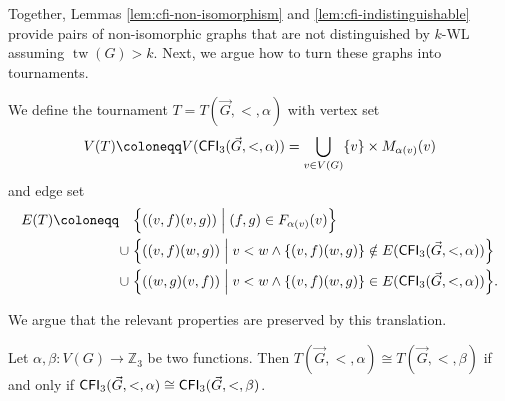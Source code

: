 \documentclass{theoretics}
\newcommand{\ZZ}{{\mathbb Z}}
\newcommand{\Bigmid}{\;\Big|\;}
\DeclareMathOperator{\tw}{tw}
\newcommand{\CFI}{{\sf CFI}}
\begin{document}
Together, Lemmas \ref{lem:cfi-non-isomorphism} and \ref{lem:cfi-indistinguishable} provide pairs of non-isomorphic graphs that are not distinguished by $k$-WL assuming $\tw(G) > k$.
Next, we argue how to turn these graphs into tournaments.

We define the tournament $T = T(\vec{G},<,\alpha)$ with vertex set
\[V(T) \coloneqq V(\CFI_3(\vec{G},<,\alpha)) = \bigcup_{v \in V(G)} \{v\} \times M_{\alpha(v)}(v)\]
and edge set
\begin{align*}
 E(T) \coloneqq \quad  &\Big\{((v,f)(v,g)) \Bigmid (f,g) \in F_{\alpha(v)}(v)\Big\}\\
                \cup\; &\Big\{((v,f)(w,g)) \Bigmid v < w \wedge \{(v,f)(w,g)\} \notin E(\CFI_3(\vec{G},<,\alpha))\Big\}\\
                \cup\; &\Big\{((w,g)(v,f)) \Bigmid v < w \wedge \{(v,f)(w,g)\} \in E(\CFI_3(\vec{G},<,\alpha))\Big\}.
\end{align*}

We argue that the relevant properties are preserved by this translation.

\begin{lemma}
 \label{lem:cfi-tournament-isomorphism}
 Let $\alpha,\beta\colon V(G) \to \ZZ_3$ be two functions.
 Then $T(\vec{G},<,\alpha) \cong T(\vec{G},<,\beta)$ if and only if $\CFI_3(\vec{G},<,\alpha) \cong \CFI_3(\vec{G},<,\beta)$.
\end{lemma}
\end{document}
